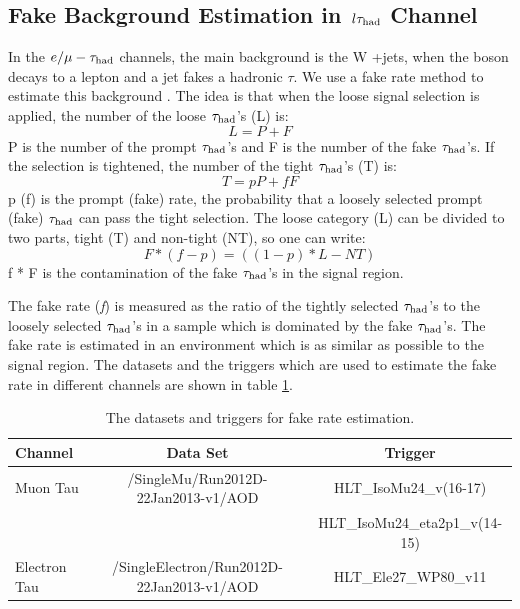 \subsection{\texorpdfstring{Fake Background Estimation in $\,l\tau_{\rm had}$ Channel}{Fake Background Estimation in lepton-tau Channel}}
\label{sect:bkgLeptau}
In the $e/\mu-\tau_{\rm had}$ channels, the main background is the W +jets, when the \Wpm boson decays to a lepton and a jet fakes a hadronic $\tau$.
We use a fake rate method to estimate this background \cite{CMS_AN_2010-261}. 
The idea is that when the loose signal selection is applied, the number of the loose $\tau_{\rm had}$'s (L) is:
\begin{equation}
L = P + F
\end{equation}
P is the number of the  prompt $\tau_{\rm had}$'s and F is the number of the  fake $\tau_{\rm had}$'s. If the selection is tightened, the number of the tight $\tau_{\rm had}$'s (T) is:
\begin{equation}
 T = pP + fF
\end{equation} 
p (f) is the prompt (fake) rate, the probability that a loosely selected prompt (fake) $\tau_{\rm had}$ can pass the  tight  selection. The loose category (L) can be divided to two parts, 
tight (T) and non-tight (NT), so one can write:
\begin{equation}
   F * (f - p) = ((1 - p) * L - NT)
\end{equation}
f * F is the contamination of the fake $\tau_{\rm had}$'s in the signal region. 

The fake rate ({\it f}) is measured as the ratio of the tightly selected $\tau_{\rm had}$'s to the loosely 
selected $\tau_{\rm had}$'s in a sample which is dominated by the fake $\tau_{\rm had}$'s. The fake rate is estimated in an environment which is as similar as possible to 
the signal region. The datasets and the triggers which are used to estimate the fake rate in different channels are shown in 
table \ref{Tab.DataFR}.
\begin{table}[!htb]
\begin{center}
\caption{The datasets and triggers for fake rate estimation.}
\label{Tab.DataFR}
\begin{tabular}{|l|c|c|}
\hline
Channel      & Data Set                                     & Trigger \\\hline
Muon Tau     & /SingleMu/Run2012D-22Jan2013-v1/AOD          & HLT\_IsoMu24\_v(16-17)\\
             &                                              & HLT\_IsoMu24\_eta2p1\_v(14-15)\\\hline
Electron Tau & /SingleElectron/Run2012D-22Jan2013-v1/AOD    & HLT\_Ele27\_WP80\_v11\\
\hline
\end{tabular}
\end{center}
\end{table}

